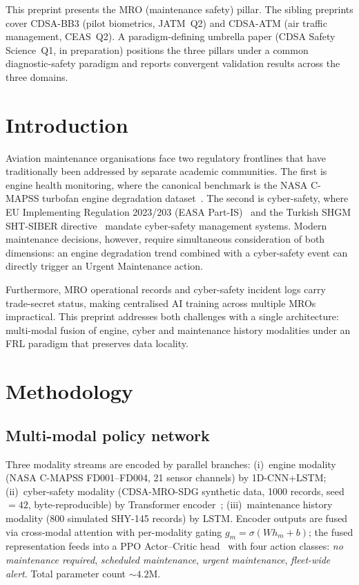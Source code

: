 \documentclass[11pt]{article}
\begin{document}
This preprint presents the MRO (maintenance safety) pillar. The sibling preprints cover CDSA-BB3 (pilot biometrics, JATM~Q2) and CDSA-ATM (air traffic management, CEAS~Q2). A paradigm-defining umbrella paper (CDSA Safety Science~Q1, in preparation) positions the three pillars under a common diagnostic-safety paradigm and reports convergent validation results across the three domains.

\section{Introduction}
Aviation maintenance organisations face two regulatory frontlines that have traditionally been addressed by separate academic communities. The first is engine health monitoring, where the canonical benchmark is the NASA C-MAPSS turbofan engine degradation dataset~\cite{saxena2008}. The second is cyber-safety, where EU Implementing Regulation 2023/203 (EASA Part-IS)~\cite{partis} and the Turkish SHGM SHT-SIBER directive~\cite{shtsiber} mandate cyber-safety management systems. Modern maintenance decisions, however, require simultaneous consideration of both dimensions: an engine degradation trend combined with a cyber-safety event can directly trigger an Urgent Maintenance action.

Furthermore, MRO operational records and cyber-safety incident logs carry trade-secret status, making centralised AI training across multiple MROs impractical. This preprint addresses both challenges with a single architecture: multi-modal fusion of engine, cyber and maintenance history modalities under an FRL paradigm that preserves data locality.

\section{Methodology}
\subsection{Multi-modal policy network}
Three modality streams are encoded by parallel branches: (i)~engine modality (NASA C-MAPSS FD001--FD004, 21 sensor channels) by 1D-CNN+LSTM; (ii)~cyber-safety modality (CDSA-MRO-SDG synthetic data, 1000 records, seed${}=42$, byte-reproducible) by Transformer encoder~\cite{vaswani2017}; (iii)~maintenance history modality (800 simulated SHY-145 records) by LSTM. Encoder outputs are fused via cross-modal attention with per-modality gating $g_m = \sigma(W h_m + b)$; the fused representation feeds into a PPO Actor--Critic head~\cite{schulman2017, sutton2018} with four action classes: \emph{no maintenance required}, \emph{scheduled maintenance}, \emph{urgent maintenance}, \emph{fleet-wide alert}. Total parameter count ${\sim}4.2$M.
\end{document}
